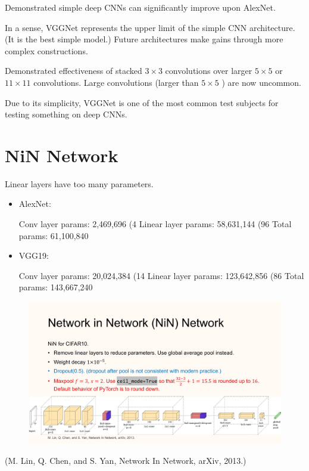 \documentclass{report}
\begin{document}
\begin{concept}
    Demonstrated simple deep CNNs can significantly improve upon AlexNet.

    In a sense, VGGNet represents the upper limit of the simple CNN architecture. (It is the best simple model.) Future architectures make gains through more complex constructions.

    Demonstrated effectiveness of stacked $3 \times 3$ convolutions over larger $5 \times 5$ or $11 \times 11$ convolutions. Large convolutions (larger than $5 \times 5$ ) are now uncommon.

    Due to its simplicity, VGGNet is one of the most common test subjects for testing something on deep CNNs.
\end{concept}

\section{NiN Network}

\begin{concept}
    Linear layers have too many parameters.

    \begin{itemize}
        \item
        AlexNet:

        Conv layer params: 2,469,696 (4%
        Linear layer params: 58,631,144 (96%
        Total params: 61,100,840
        \item
        VGG19:

        Conv layer params: 20,024,384 (14%
        Linear layer params: 123,642,856 (86%
        Total params: 143,667,240
    \end{itemize}
\end{concept}

\begin{definition}
    \begin{figure}[H]
        \centering
        \includegraphics[width=1.0\textwidth]{.././assets/7.10.jpg}
    \end{figure}

    (M. Lin, Q. Chen, and S. Yan, Network In Network, arXiv, 2013.)
\end{definition}
\end{document}
